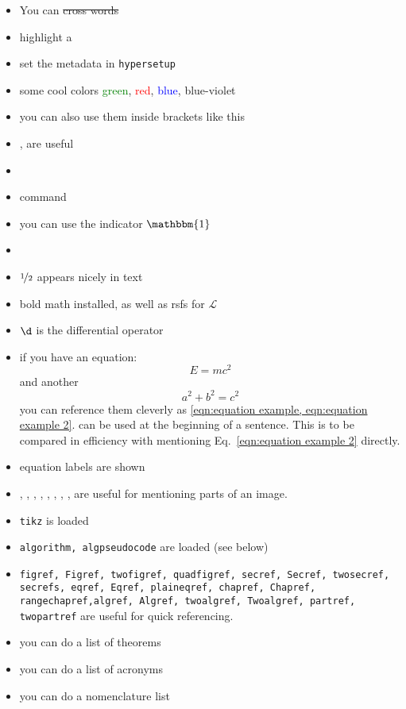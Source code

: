 \begin{itemize}
    \item You can \st{cross words}
    \item highlight a 
    \item set the metadata in \texttt{hypersetup}
    \item some cool colors \textcolor{green}{green}, \textcolor{red}{red}, \textcolor{blue}{blue}, \textcolor{blue-violet}{blue-violet}
    \item you can also use them inside brackets like {\blueviolet this}
    \item {\cmark}, {\xmark} are useful
    \item {}
    \item \done command
    \item you can use the indicator $\mathbbm{1}$
    \item {}
    \item $\nicefrac{1}{2}$ appears nicely in text
    \item bold math installed, as well as rsfs for $\mathscr{L}$
    \item $\d$ is the differential operator
    \item if you have an equation:
    \begin{equation} \label{eqn:equation example}
        E = mc^2
    \end{equation}
    and another
    \begin{equation} \label{eqn:equation example 2}
        a^2 + b^2 = c^2
    \end{equation}
    you can reference them cleverly as \cref{eqn:equation example, eqn:equation example 2}.  can be used at the beginning of a sentence. 
    \newline
    This is to be compared in efficiency with mentioning Eq.~\ref{eqn:equation example 2} directly. 
    \item equation labels are shown
    \item \figleft, \figcenter, \figright, \figtop, \figbottom, \captiona, \captionb, \captionc, \captiond are useful for mentioning parts of an image.
    \item \texttt{tikz} is loaded
    \item \texttt{algorithm, algpseudocode} are loaded (see below)
    \item \texttt{figref, Figref, twofigref, quadfigref, secref, Secref, twosecref, secrefs, eqref, Eqref, plaineqref, chapref, Chapref, rangechapref,algref, Algref, twoalgref, Twoalgref, partref, twopartref} are useful for quick referencing. 
    \item you can do a list of theorems 
    \item you can do a list of acronyms 
    \item you can do a nomenclature list 
\end{itemize}

